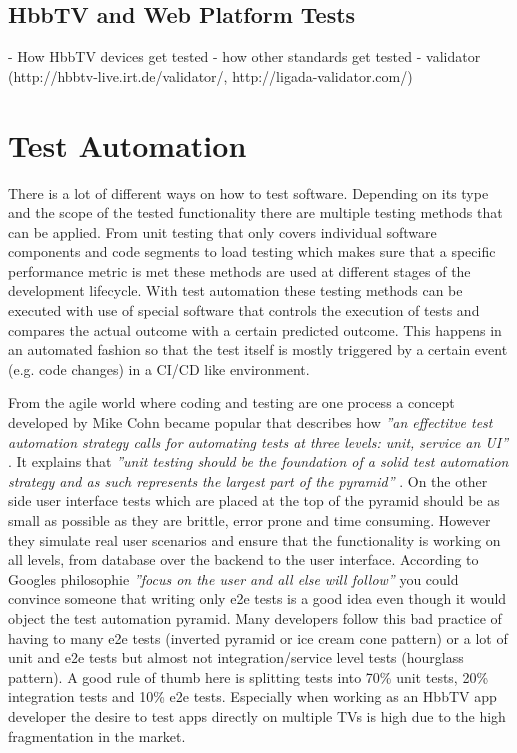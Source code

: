 \subsection{HbbTV and Web Platform Tests}

- How HbbTV devices get tested
- how other standards get tested
- validator (http://hbbtv-live.irt.de/validator/, http://ligada-validator.com/)

\section{Test Automation\label{sec:testautomation}}

There is a lot of different ways on how to test software. Depending on its type and the scope of
the tested functionality there are multiple testing methods that can be applied. From unit testing
that only covers individual software components and code segments to load testing which makes sure
that a specific performance metric is met these methods are used at different stages of the
development lifecycle. With test automation these testing methods can be executed with use of
special software that controls the execution of tests and compares the actual outcome with a
certain predicted outcome. This happens in an automated fashion so that the test itself is mostly
triggered by a certain event (e.g. code changes) in a CI/CD like environment.

From the agile world where coding and testing are one process a concept developed by Mike Cohn
became popular that describes how \textit{''an effectitve test automation strategy calls for
automating tests at three levels: unit, service an UI''} \cite{testautomation}. It explains
that \textit{''unit testing should be the foundation of a solid test automation strategy and as
such represents the largest part of the pyramid''} \cite{unittesting}. On the other side
user interface tests which are placed at the top of the pyramid should be as small as possible
as they are brittle, error prone and time consuming. However they simulate real user scenarios
and ensure that the functionality is working on all levels, from database over the backend
to the user interface. According to Googles philosophie \textit{''focus on the user and all
else will follow''} you could convince someone that writing only e2e tests is a good idea
even though it would object the test automation pyramid. Many developers follow this bad
practice of having to many e2e tests (inverted pyramid or ice cream cone pattern) or a lot
of unit and e2e tests but almost not integration/service level tests (hourglass pattern). A good
rule of thumb here is splitting tests into 70\% unit tests, 20\% integration tests and 10\%
e2e tests. Especially when working as an HbbTV app developer the desire to test apps directly
on multiple TVs is high due to the high fragmentation in the market.

